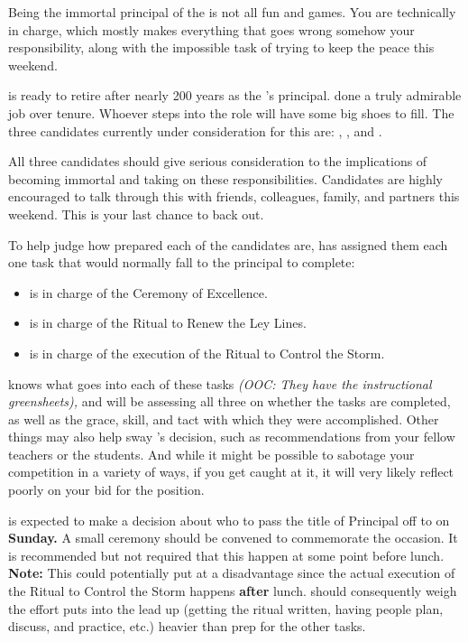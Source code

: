 \documentclass[green]{GL2020}
\begin{document}
\name{\gNewPrincipal{}}

Being the immortal principal of the \pSchool{} is not all fun and games. You are technically in charge, which mostly makes everything that goes wrong somehow your responsibility, along with the impossible task of trying to keep the peace this weekend.

\cPrincipal{\full} is ready to retire after nearly 200 years as the \pSc{}’s principal. \cPrincipal{\They} \cPrincipal{\have} done a truly admirable job over \cPrincipal{\their} tenure. Whoever steps into the role will have some big shoes to fill. The three candidates currently under consideration for this are: \cMusic{\full}, \cBeetle{\full}, and \cChupSecond{\full}. 

All three candidates should give serious consideration to the implications of becoming immortal and taking on these responsibilities. Candidates are highly encouraged to talk through this with friends, colleagues, family, and partners this weekend. This is your last chance to back out.

To help judge how prepared each of the candidates are, \cPrincipal{} has assigned them each one task that would normally fall to the principal to complete:
\begin{itemize}
  \item \cMusic{} is in charge of the Ceremony of Excellence.
  \item \cBeetle{} is in charge of the Ritual to Renew the Ley Lines.
  \item \cChupSecond{} is in charge of the execution of the Ritual to Control the Storm.
\end{itemize}

\cPrincipal{} knows what goes into each of these tasks \emph{(OOC: They have the instructional greensheets),} and will be assessing all three on whether the tasks are completed, as well as the grace, skill, and tact with which they were accomplished. Other things may also help sway \cPrincipal{}’s decision, such as recommendations from your fellow teachers or the students. And while it might be possible to sabotage your competition in a variety of ways, if you get caught at it, it will very likely reflect poorly on your bid for the position.

\cPrincipal{} is expected to make a decision about who to pass the title of Principal off to on \textbf{Sunday.} A small ceremony should be convened to commemorate the occasion. It is recommended but not required that this happen at some point before lunch. \textbf{Note:} This could potentially put \cChupSecond{} at a disadvantage since the actual execution of the Ritual to Control the Storm happens \textbf{after} lunch. \cPrincipal{} should consequently weigh the effort \cChupSecond{} puts into the lead up (getting the ritual written, having people plan, discuss, and practice, etc.) heavier than prep for the other tasks. 
\end{document}
